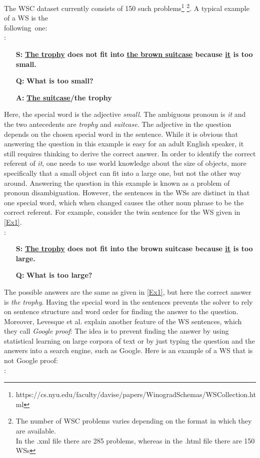 The WSC dataset currently consists of 150 such problems\footnote{https://cs.nyu.edu/faculty/davise/papers/WinogradSchemas/WSCollection.html} \footnote{The number of WSC problems varies depending on the format in which they are available.\\In the .xml file there are 285 problems, whereas in the .html file there are 150 WSs}. A typical example of a WS is the \\following~one:\\
:
\begin{itemize} 
	\item[\textbf{S:}] \textbf{\underline{The trophy} does not fit into \underline{the brown suitcase} because \underline{it} is too small.}
	\item[\textbf{Q:}] \textbf{What is too small?}
	\item[\textbf{A:}] \textbf{\underline{The suitcase}/the trophy}
\end{itemize}

Here, the special word is the adjective \textit{small}. The ambiguous pronoun is \textit{it} and the two antecedents are \textit{trophy} and \textit{suitcase}. The adjective in the question depends on the chosen special word in the sentence. While it is obvious that answering the question in this example is easy for an adult English speaker, it still requires thinking to derive the correct answer. In order to identify the correct referent of \textit{it}, one needs to use world knowledge about the size of objects, more specifically that a small object can fit into a large one, but not the other way around. Answering the question in this example is known as a problem of pronoun disambiguation. However, the sentences in the WSs are distinct in that one special word, which when changed causes the other noun phrase to be the correct referent. For example, consider the twin sentence for the WS given in \ref{Ex1}.\\
:
\begin{itemize} 
	\item[\textbf{S:}] \textbf{\underline{The trophy} does not fit into the brown suitcase because \underline{it} is too large.}
	\item[\textbf{Q:}] \textbf{What is too large?}
\end{itemize}

The possible answers are the same as given in \ref{Ex1}, but here the correct answer is \textit{the trophy}. Having the special word in the sentences prevents the solver to rely on sentence structure and word order for finding the answer to the question. 
Moreover, Levesque et al. \cite{DBLP:conf/kr/LevesqueDM12} explain another feature of the WS sentences, which they call \textit{Google proof}: The idea is to prevent finding the answer by using statistical learning on large corpora of text or by just typing the question and the answers into a search engine, such as Google. 
Here is an example of a WS that is not Google proof:\\
:

